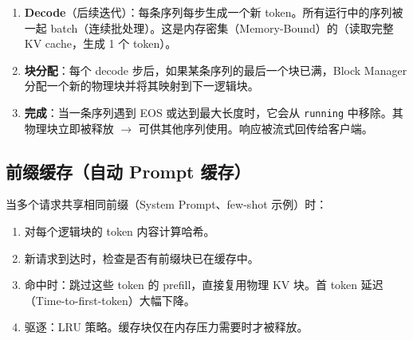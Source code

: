 \begin{enumerate}
  \item \textbf{Decode}（后续迭代）：每条序列每步生成一个新 token。所有运行中的序列被一起 batch（连续批处理）。这是内存密集（Memory-Bound）的（读取完整 KV cache，生成 1 个 token）。
  \item \textbf{块分配}：每个 decode 步后，如果某条序列的最后一个块已满，Block Manager 分配一个新的物理块并将其映射到下一逻辑块。
  \item \textbf{完成}：当一条序列遇到 EOS 或达到最大长度时，它会从 \texttt{running} 中移除。其物理块立即被释放 $\rightarrow$ 可供其他序列使用。响应被流式回传给客户端。
\end{enumerate}

\subsection{前缀缓存（自动 Prompt 缓存）}
\label{prefix-caching-automatic-prompt-caching}

当多个请求共享相同前缀（System Prompt、few-shot 示例）时：

\begin{enumerate}
  \item 对每个逻辑块的 token 内容计算哈希。
  \item 新请求到达时，检查是否有前缀块已在缓存中。
  \item 命中时：跳过这些 token 的 prefill，直接复用物理 KV 块。首 token 延迟（Time-to-first-token）大幅下降。
  \item 驱逐：LRU 策略。缓存块仅在内存压力需要时才被释放。
\end{enumerate}

